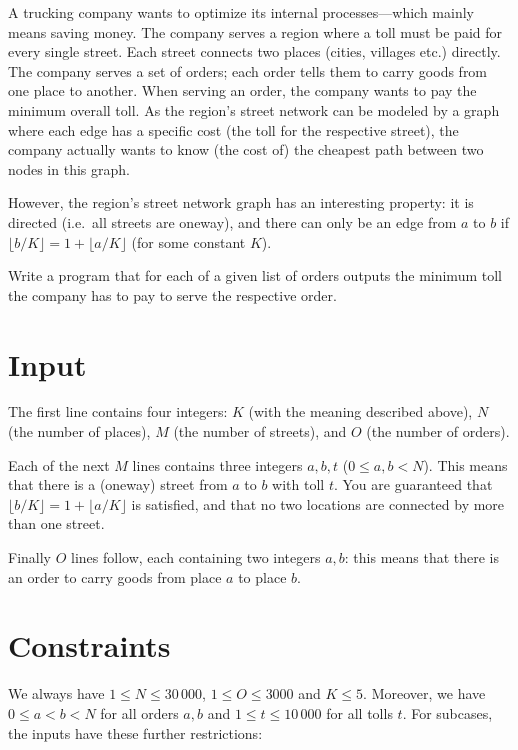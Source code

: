 
\noindent
A trucking company wants to optimize its internal processes---which mainly means saving money. The company serves a region where a toll must be paid for every single street.  Each street connects two places (cities, villages etc.) directly.  The company serves a set of orders; each order tells them to carry goods from one place to another.  When serving an order, the company wants to pay the minimum overall toll.  As the region's street network can be modeled by a graph where each edge has a specific cost (the toll for the respective street), the company actually wants to know (the cost of) the cheapest path between two nodes in this graph.

However, the region's street network graph has an interesting property: it is directed (i.e.~all streets are oneway), and there can only be an edge from $a$ to $b$ if $\lfloor b/K\rfloor = 1 + \lfloor a/K\rfloor$ (for some constant $K$).

Write a program that for each of a given list of orders outputs the minimum toll the company has to pay to serve the respective order.

\section*{Input}

The first line contains four integers: $K$ (with the meaning described above), $N$ (the number of places), $M$ (the number of streets), and $O$ (the number of orders).

Each of the next $M$ lines contains three integers $a,b,t$ ($0 \leq a, b < N$). This means that there is a (oneway) street from $a$ to $b$ with toll $t$. You are guaranteed that $\lfloor b/K\rfloor = 1 + \lfloor a/K\rfloor$ is satisfied, and that no two locations are connected by more than one street.

Finally $O$ lines follow, each containing two integers $a,b$: this means that there is an order to carry goods from place $a$ to place $b$.

\section*{Constraints}
We always have $1 \leq N \leq 30\,000$, $1 \leq O \leq 3000$ and $K\leq 5$. Moreover, we have $0 \leq a < b < N$ for all orders $a,b$ and $1 \leq t \leq 10\,000$ for all tolls $t$. For subcases, the inputs have these further restrictions:

